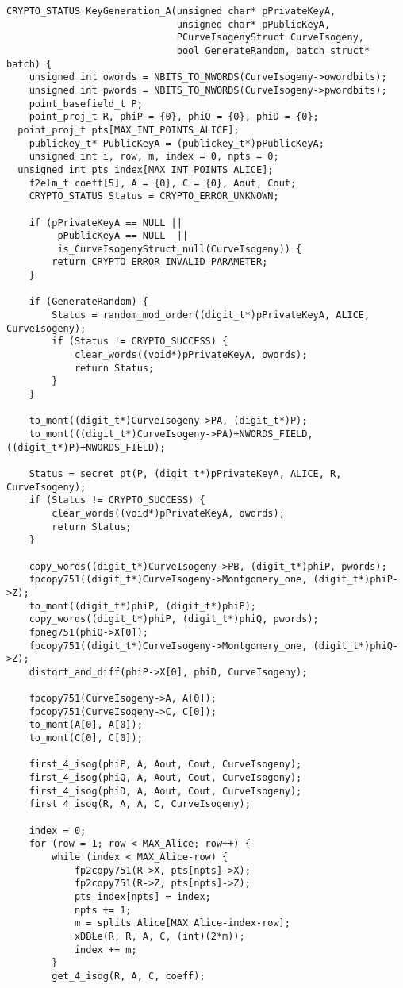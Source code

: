 \begin{lstlisting}[basicstyle=\tiny,]
CRYPTO_STATUS KeyGeneration_A(unsigned char* pPrivateKeyA,
                              unsigned char* pPublicKeyA,
							  PCurveIsogenyStruct CurveIsogeny,
							  bool GenerateRandom, batch_struct* batch) {
	unsigned int owords = NBITS_TO_NWORDS(CurveIsogeny->owordbits);
	unsigned int pwords = NBITS_TO_NWORDS(CurveIsogeny->pwordbits);
	point_basefield_t P;
	point_proj_t R, phiP = {0}, phiQ = {0}, phiD = {0};
  point_proj_t pts[MAX_INT_POINTS_ALICE];
	publickey_t* PublicKeyA = (publickey_t*)pPublicKeyA;
	unsigned int i, row, m, index = 0, npts = 0;
  unsigned int pts_index[MAX_INT_POINTS_ALICE];
	f2elm_t coeff[5], A = {0}, C = {0}, Aout, Cout;
	CRYPTO_STATUS Status = CRYPTO_ERROR_UNKNOWN;

	if (pPrivateKeyA == NULL ||
         pPublicKeyA == NULL  ||
         is_CurveIsogenyStruct_null(CurveIsogeny)) {
		return CRYPTO_ERROR_INVALID_PARAMETER;
	}

	if (GenerateRandom) {
		Status = random_mod_order((digit_t*)pPrivateKeyA, ALICE, CurveIsogeny);
		if (Status != CRYPTO_SUCCESS) {
			clear_words((void*)pPrivateKeyA, owords);
			return Status;
		}
	}

	to_mont((digit_t*)CurveIsogeny->PA, (digit_t*)P);
	to_mont(((digit_t*)CurveIsogeny->PA)+NWORDS_FIELD, ((digit_t*)P)+NWORDS_FIELD);

	Status = secret_pt(P, (digit_t*)pPrivateKeyA, ALICE, R, CurveIsogeny);
	if (Status != CRYPTO_SUCCESS) {
		clear_words((void*)pPrivateKeyA, owords);
		return Status;
	}

	copy_words((digit_t*)CurveIsogeny->PB, (digit_t*)phiP, pwords);
	fpcopy751((digit_t*)CurveIsogeny->Montgomery_one, (digit_t*)phiP->Z);
	to_mont((digit_t*)phiP, (digit_t*)phiP);
	copy_words((digit_t*)phiP, (digit_t*)phiQ, pwords);
	fpneg751(phiQ->X[0]);
	fpcopy751((digit_t*)CurveIsogeny->Montgomery_one, (digit_t*)phiQ->Z);
	distort_and_diff(phiP->X[0], phiD, CurveIsogeny);

	fpcopy751(CurveIsogeny->A, A[0]);
	fpcopy751(CurveIsogeny->C, C[0]);
	to_mont(A[0], A[0]);
	to_mont(C[0], C[0]);

	first_4_isog(phiP, A, Aout, Cout, CurveIsogeny);
	first_4_isog(phiQ, A, Aout, Cout, CurveIsogeny);
	first_4_isog(phiD, A, Aout, Cout, CurveIsogeny);
	first_4_isog(R, A, A, C, CurveIsogeny);

	index = 0;
	for (row = 1; row < MAX_Alice; row++) {
		while (index < MAX_Alice-row) {
			fp2copy751(R->X, pts[npts]->X);
			fp2copy751(R->Z, pts[npts]->Z);
			pts_index[npts] = index;
			npts += 1;
			m = splits_Alice[MAX_Alice-index-row];
			xDBLe(R, R, A, C, (int)(2*m));
			index += m;
		}
		get_4_isog(R, A, C, coeff);


\end{lstlisting}
